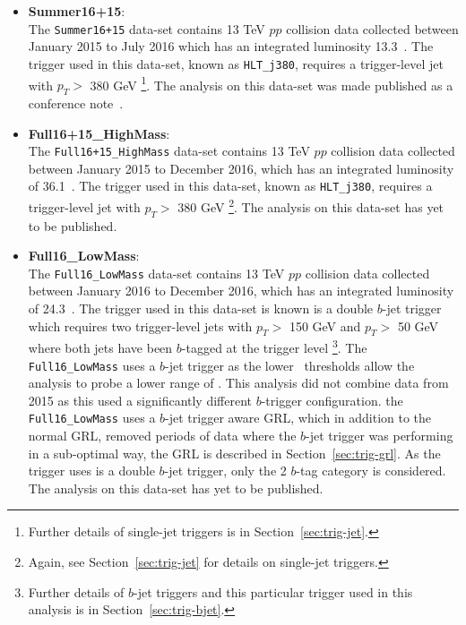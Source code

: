 \begin{itemize}[leftmargin=*]
\item\textbf{Summer16+15}: \\
  The \verb|Summer16+15| data-set contains 13 TeV $pp$ collision data collected
  between January 2015 to July 2016 which has an integrated luminosity 13.3~\ifb.
  The trigger used in this data-set, known as \verb|HLT_j380|,
  requires a trigger-level jet with $p_T >$ 380 GeV
  \footnote{\label{foot1} Further details of single-jet triggers is in Section~\ref{sec:trig-jet}.}.
  The analysis on this data-set was made published as a conference note~\cite{dibjet-ichep_conf}. \\
  
\item\textbf{Full16+15\_HighMass}:\\
  The \verb|Full16+15_HighMass| data-set contains 13 TeV $pp$ collision data collected
  between January 2015 to December 2016, which has an integrated luminosity of 36.1~\ifb.
  The trigger used in this data-set, known as \verb|HLT_j380|,
  requires a trigger-level jet with $p_T >$ 380 GeV
  \footnote{Again, see  Section~\ref{sec:trig-jet} for details on single-jet triggers.}.
  The analysis on this data-set has yet to be published.\\
  
\item\textbf{Full16\_LowMass}: \\
  The \verb|Full16_LowMass| data-set contains 13 TeV $pp$ collision data collected
  between January 2016 to December 2016, which has an integrated luminosity of 24.3~\ifb.
  The trigger used in this data-set is known is a double $b$-jet trigger 
  which requires two trigger-level jets with $p_T >$ 150 GeV and $p_T >$ 50 GeV
  where both jets have been $b$-tagged at the trigger level
  \footnote{Further details of $b$-jet triggers and this particular trigger used in this analysis is in Section~\ref{sec:trig-bjet}.}.
  The \verb|Full16_LowMass| uses a $b$-jet trigger as the lower \pT~thresholds allow
  the analysis to probe a lower range of \mjj.
  This analysis did not combine data from 2015 as this used a significantly different $b$-trigger configuration.
  the \verb|Full16_LowMass| uses a $b$-jet trigger aware GRL, which in addition to the normal GRL,
  removed periods of data where the $b$-jet trigger was performing in a sub-optimal way,
  the GRL is described in Section~\ref{sec:trig-grl}.
  As the trigger uses is a double $b$-jet trigger, only the 2 $b$-tag category is considered.
  The analysis on this data-set has yet to be published.

\end{itemize}

